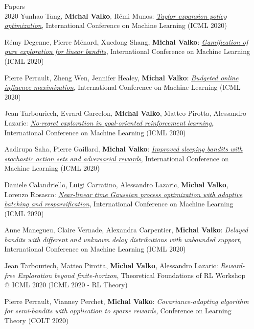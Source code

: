 \documentclass{resume}
\begin{document}
\begin{category}{Papers\\2020}
\citembullet
Yunhao Tang, {\bf Michal Valko}, R\' emi Munos:
\href{https://arxiv.org/pdf/1910.10945.pdf}
{\emph{Taylor expansion policy optimization}},
International Conference on Machine Learning
({\sf ICML 2020}) 

\citembullet
R\' emy Degenne, Pierre M\' enard, Xuedong Shang, {\bf Michal Valko}:
\href{https://arxiv.org/pdf/1910.10945.pdf}
{\emph{Gamification of pure exploration for linear bandits}},
International Conference on Machine Learning
({\sf ICML 2020}) 

\citembullet
Pierre Perrault, Zheng Wen, Jennifer Healey, {\bf Michal Valko}:
\href{https://hal.archives-ouvertes.fr/hal-02904278/document}
{\emph{Budgeted online influence maximization}},
International Conference on Machine Learning
({\sf ICML 2020}) 

\citembullet
Jean Tarbouriech, Evrard Garcelon, {\bf Michal Valko}, Matteo Pirotta, Alessandro Lazaric:
\href{https://arxiv.org/pdf/2003.06259.pdf}
{\emph{No-regret exploration in goal-oriented reinforcement learning}},
International Conference on Machine Learning
({\sf ICML 2020}) 

\citembullet
Aadirupa Saha, Pierre Gaillard, {\bf Michal Valko}:
\href{https://arxiv.org/abs/2004.06248}
{\emph{Improved sleeping bandits with stochastic action sets and adversarial rewards}},
International Conference on Machine Learning
({\sf ICML 2020}) 


\citembullet
Daniele Calandriello, Luigi Carratino, Alessandro Lazaric,  {\bf Michal Valko}, Lorenzo Rosasco:
\href{https://arxiv.org/pdf/2002.09954.pdf}
{\emph{Near-linear time Gaussian process optimization with adaptive batching and resparsification}},
International Conference on Machine Learning
({\sf ICML 2020}) 

\citembullet
Anne Manegueu, Claire Vernade, Alexandra Carpentier, {\bf Michal Valko}:
\emph{Delayed bandits with different and unknown delay distributions with unbounded support},
International Conference on Machine Learning
({\sf ICML 2020}) 

\citembullet
Jean Tarbouriech, Matteo Pirotta, {\bf Michal Valko}, Alessandro Lazaric:
{\emph{Reward-free Exploration beyond finite-horizon}},
Theoretical Foundations of RL Workshop @ ICML 2020
({\sf ICML 2020 - RL Theory}) 


\citembullet
Pierre Perrault, Vianney Perchet,   {\bf Michal Valko}:
\emph{Covariance-adapting algorithm for semi-bandits with application to sparse rewards},
Conference on Learning Theory
({\sf COLT 2020}) 


\end{category}
\end{document}
